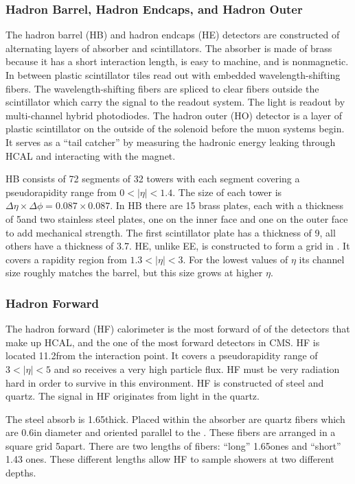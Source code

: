 \subsubsection{Hadron Barrel, Hadron Endcaps, and Hadron Outer}

The hadron barrel (HB) and hadron endcaps (HE) detectors are constructed of
alternating layers of absorber and scintillators. The absorber is made of brass
because it has a short interaction length, is easy to machine, and is
nonmagnetic. In between plastic scintillator tiles read out with embedded
wavelength-shifting fibers. The wavelength-shifting fibers are spliced to clear
fibers outside the scintillator which carry the signal to the readout system.
The light is readout by multi-channel hybrid photodiodes. The hadron outer (HO)
detector is a layer of plastic scintillator on the outside of the solenoid
before the muon systems begin. It serves as a ``tail catcher'' by measuring the
hadronic energy leaking through HCAL and interacting with the magnet.

HB consists of 72 segments of 32 towers with each segment covering a
pseudorapidity range from $0 < |\eta| < 1.4$. The size of each tower is $\Delta
\eta \times \Delta \phi = 0.087 \times 0.087$. In HB there are 15 brass plates,
each with a thickness of 5\centimeters and two stainless steel plates, one on
the inner face and one on the outer face to add mechanical strength. The first
scintillator plate has a thickness of 9\millimeters, all others have a
thickness of 3.7\millimeters. HE, unlike EE, is constructed to form a grid in
\coordetaphi. It covers a rapidity region from $1.3 < |\eta| < 3$. For the
lowest values of $\eta$ its channel size roughly matches the barrel, but this
size grows at higher $\eta$.

\subsubsection{Hadron Forward}

The hadron forward (HF) calorimeter is the most forward of of the detectors
that make up HCAL, and the one of the most forward detectors in CMS. HF is
located 11.2\meters from the interaction point. It covers a pseudorapidity
range of $3 < |\eta| < 5$ and so receives a very high particle flux. HF must be
very radiation hard in order to survive in this environment. HF is constructed
of steel and quartz. The signal in HF originates from \Cherenkov light in the
quartz.

The steel absorb is 1.65\meters thick. Placed within the absorber are quartz
fibers which are 0.6\millimeters in diameter and oriented parallel to the
\zaxis. These fibers are arranged in a square grid 5\millimeters apart. There
are two lengths of fibers: ``long'' 1.65\meters ones and ``short'' 1.43\meters
ones. These different lengths allow HF to sample showers at two different
depths.

